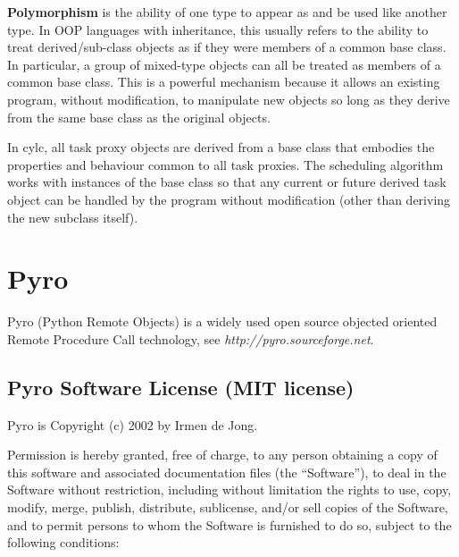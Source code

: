 \documentclass[11pt,a4paper]{article}
\begin{document}
{\bf Polymorphism} is the ability of one type to appear as and be used
like another type.  In OOP languages with inheritance, this usually
refers to the ability to treat derived/sub-class objects as if they were
members of a common base class. In particular, a group of mixed-type
objects can all be treated as members of a common base class. 
This is a powerful mechanism because it allows an existing program,
without modification, to manipulate new objects so long as they 
derive from the same base class as the original objects.

In cylc, all task proxy objects are derived from a base class that 
embodies the properties and behaviour common to all task proxies. 
The scheduling algorithm works with instances of the base class so that
any current or future derived task object can be handled by the program
without modification (other than deriving the new subclass itself).


\pagebreak
\section{Pyro} 
\label{Pyro}

Pyro (Python Remote Objects) is a widely used open source objected
oriented Remote Procedure Call technology, see {\em
http://pyro.sourceforge.net}.

\subsection{Pyro Software License (MIT license)}
\label{PyroSoftwareLicense(MITlicense)}

Pyro is Copyright (c) 2002  by Irmen de Jong.

Permission is hereby granted, free of charge, to any person obtaining a
copy of this software and associated documentation files (the
``Software''), to deal in the Software without restriction, including
without limitation the rights to use, copy, modify, merge, publish,
distribute, sublicense, and/or sell copies of the Software, and to
permit persons to whom the Software is furnished to do so, subject to
the following conditions:
\end{document}
